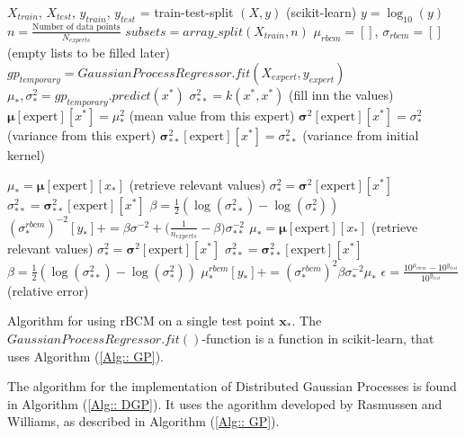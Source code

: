 \documentclass[twoside,english]{uiofysmaster}
\begin{document}
\begin{algorithm}
$X_{train}$, $X_{test}$, $y_{train}$, $y_{test}$ = train-test-split $(X, y)$ (scikit-learn) \;
$y = \log_{10} (y)$ \;
$n = \frac{\text{Number of data points}}{N_{experts}}$ \;
$subsets = array\_split (X_{train}, n)$ \;
$\mu_{rbcm} = []$, $\sigma_{rbcm} = []$  (empty lists to be filled later)\; 
{
$gp_{temporary} = GaussianProcessRegressor.fit(X_{expert}, y_{expert})$ \;
 {
 $\mu_*,\sigma_*^2 = gp_{temporary}.predict(x^*)$ \;
 $\sigma_{**}^2 = k (x^*, x^*)$ \;
 (fill inn the values) \;
 $\boldsymbol{\mu}[\text{expert}][x^*] = \mu_*^2$ (mean value from this expert)\;
 $\boldsymbol{\sigma}^2[\text{expert}][x^*] = \sigma_*^2$ (variance from this expert)\;
 $\boldsymbol{\sigma}_{**}^2[\text{expert}][x^*] = \sigma_{**}^2$ (variance from initial kernel)
 }
}
 
{ 
{ $\mu_* = \boldsymbol{\mu}[\text{expert}][x_*]$ (retrieve relevant values)\;
$\sigma_*^2 = \boldsymbol{\sigma}^2[\text{expert}][x^*]$ \;
$\sigma_{**}^2 = \boldsymbol{\sigma}_{**}^2[\text{expert}][x^*]$ \; 
$\beta = \frac{1}{2} (\log (\sigma_{**}^2) - \log (\sigma_*^2))$ \;
$(\sigma_*^{rbcm})^{-2}[y_*] += \beta \sigma^{-2} + \big(\frac{1}{n_{experts}} - \beta \big) \sigma_{**}^{-2} $ }
 }  
{
 {
$\mu_* = \boldsymbol{\mu}[\text{expert}][x_*]$ (retrieve relevant values)\;
$\sigma_*^2 = \boldsymbol{\sigma}^2[\text{expert}][x^*]$ \;
$\sigma_{**}^2 = \boldsymbol{\sigma}_{**}^2[\text{expert}][x^*]$ \; 
$\beta = \frac{1}{2} (\log (\sigma_{**}^2) - \log (\sigma_*^2))$ \;
$\mu_*^{rbcm}[y_*] += (\sigma_*^{rbcm})^2 \beta \sigma^{-2}_* \mu_*$
 }
} 
$\epsilon = \frac{10^{\mu_{rbcm}} - 10^{y_{test}}}{10^{y_{test}}}$ (relative error)\;
 \caption{Algorithm for using rBCM on a single test point $\textbf{x}_*$. The $GaussianProcessRegressor.fit()$-function is a function in scikit-learn, that uses Algorithm (\ref{Alg:: GP}). }
\label{Alg:: DGP}
\end{algorithm}

The algorithm for the implementation of Distributed Gaussian Processes is found in Algorithm (\ref{Alg:: DGP}). It uses the agorithm developed by Rasmussen and Williams, as described in Algorithm (\ref{Alg:: GP}).
\end{document}
